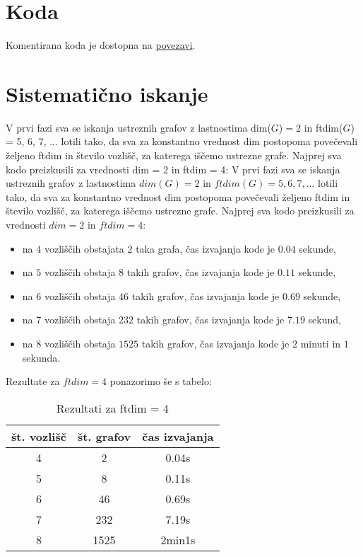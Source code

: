 \documentclass[12pt]{article}
\begin{document}
\section{Koda}
Komentirana koda je dostopna na \href{https://github.com/HanaSamsa/Problem-metricnih-dimenzij-odpornih-na-napake.git}{povezavi}.

\section{Sistematično iskanje}

V prvi fazi sva se iskanja ustreznih grafov z lastnostima dim($G$)$ =2$ in ftdim($G$) = 5, 6, 7, ... 
lotili tako, da sva za konstantno vrednost dim postopoma povečevali željeno ftdim in število vozlišč, za 
katerega iščemo ustrezne grafe. Najprej sva kodo preizkusili za vrednosti dim = 2 in ftdim = 4:
V prvi fazi sva se iskanja ustreznih grafov z lastnostima $dim(G) =2$ in $ftdim(G) = 5, 6, 7, ...$ lotili tako, da sva za 
konstantno vrednost dim postopoma povečevali željeno ftdim in število vozlišč, za katerega iščemo ustrezne grafe. Najprej sva 
kodo preizkusili za vrednosti $dim = 2$ in $ftdim = 4$:
\begin{itemize}
    \item na $4$ vozliščih obstajata $2$ taka grafa, čas izvajanja kode je $0.04$ sekunde,
    \item na $5$ vozliščih obstaja $8$ takih grafov, čas izvajanja kode je $0.11$ sekunde,
    \item na $6$ vozliščih obstaja $46$ takih grafov, čas izvajanja kode je $0.69$ sekunde,
    \item na $7$ vozliščih obstaja $232$ takih grafov, čas izvajanja kode je $7.19$ sekund,
    \item na $8$ vozliščih obstaja $1525$ takih grafov, čas izvajanja kode je $2$ minuti in $1$ sekunda.
\end{itemize}

Rezultate za $ftdim = 4$ ponazorimo še s tabelo:

\begin{table}[H] 
    \centering 
 	\begin{tabular}{|c|c|c|} 
 	\hline 
 	\textbf{št. vozlišč} & \textbf{št. grafov} & \textbf{čas izvajanja} \\
 		\hline 4 & 2 & 0.04s  \\ 
 		\hline 5 & 8 & 0.11s \\ 
 		\hline 6 & 46 & 0.69s \\ 
 		\hline 7 & 232 & 7.19s \\
 		\hline 8 & 1525 & 2min1s \\
 		\hline 
 	\end{tabular} 
 	\caption{Rezultati za ftdim = 4}
 	\label{tab:ftdim4}
\end{table}
\end{document}
